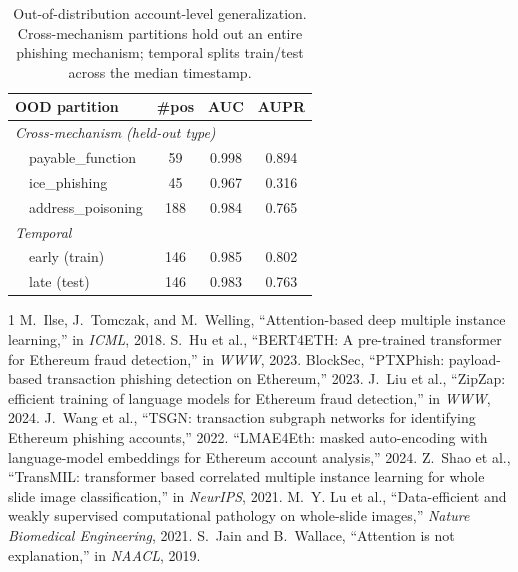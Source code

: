 \documentclass[conference]{IEEEtran}
\begin{document}
\begin{table}[t]\centering\caption{Out-of-distribution account-level generalization.
Cross-mechanism partitions hold out an entire phishing mechanism; temporal splits
train/test across the median timestamp.}\label{tab:ood}
\begin{tabular}{lccc}\toprule
\textbf{OOD partition} & \textbf{\#pos} & \textbf{AUC} & \textbf{AUPR} \\\midrule
\multicolumn{4}{l}{\emph{Cross-mechanism (held-out type)}}\\
\ \ payable\_function & 59 & 0.998 & 0.894 \\
\ \ ice\_phishing & 45 & 0.967 & 0.316 \\
\ \ address\_poisoning & 188 & 0.984 & 0.765 \\
\multicolumn{4}{l}{\emph{Temporal}}\\
\ \ early (train) & 146 & 0.985 & 0.802 \\
\ \ late (test) & 146 & 0.983 & 0.763 \\
\bottomrule\end{tabular}\end{table}

\begin{thebibliography}{1}
 M.~Ilse, J.~Tomczak, and M.~Welling, ``Attention-based deep
multiple instance learning,'' in \emph{ICML}, 2018.
 S.~Hu et al., ``BERT4ETH: A pre-trained transformer for
Ethereum fraud detection,'' in \emph{WWW}, 2023.
 BlockSec, ``PTXPhish: payload-based transaction phishing
detection on Ethereum,'' 2023.
 J.~Liu et al., ``ZipZap: efficient training of language models for
Ethereum fraud detection,'' in \emph{WWW}, 2024.
 J.~Wang et al., ``TSGN: transaction subgraph networks for
identifying Ethereum phishing accounts,'' 2022.
 ``LMAE4Eth: masked auto-encoding with language-model embeddings
for Ethereum account analysis,'' 2024.
 Z.~Shao et al., ``TransMIL: transformer based correlated
multiple instance learning for whole slide image classification,'' in
\emph{NeurIPS}, 2021.
 M.~Y. Lu et al., ``Data-efficient and weakly supervised
computational pathology on whole-slide images,'' \emph{Nature Biomedical
Engineering}, 2021.
 S.~Jain and B.~Wallace, ``Attention is not explanation,'' in
\emph{NAACL}, 2019.
\end{thebibliography}
\end{document}
